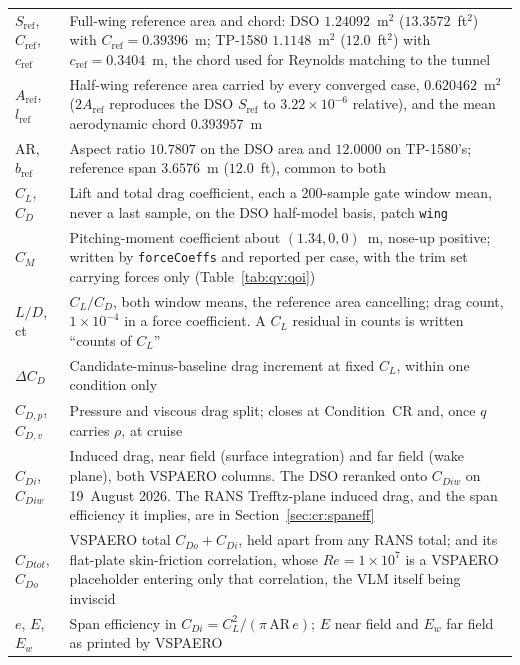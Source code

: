 \documentclass[10pt,a4paper]{article}
\begin{document}
{\begin{longtable}{@{}p{}p{}@{}}
$S_\mathrm{ref}$, $C_\mathrm{ref}$, $c_\mathrm{ref}$ & Full-wing reference area and chord: DSO
  $\num{1.24092}$~m$^2$ ($13.3572$~ft$^2$) with $C_\mathrm{ref}=\num{0.39396}$~m; TP-1580
  $\num{1.1148}$~m$^2$ ($12.0$~ft$^2$) with $c_\mathrm{ref}=\num{0.3404}$~m, the chord used for
  Reynolds matching to the tunnel \\
$A_\mathrm{ref}$, $l_\mathrm{ref}$ & Half-wing reference area carried by every converged case,
  $\num{0.620462}$~m$^2$ ($2A_\mathrm{ref}$ reproduces the DSO $S_\mathrm{ref}$ to
  $3.22\times10^{-6}$ relative), and the mean aerodynamic chord $\num{0.393957}$~m \\
AR, $b_\mathrm{ref}$ & Aspect ratio $\num{10.7807}$ on the DSO area and $\num{12.0000}$ on
  TP-1580's; reference span $\num{3.6576}$~m ($12.0$~ft), common to both \\
\addlinespace
$C_L$, $C_D$ & Lift and total drag coefficient, each a 200-sample gate window mean, never a last
  sample, on the DSO half-model basis, patch \texttt{wing} \\
$C_M$ & Pitching-moment coefficient about $(1.34,0,0)$~m, nose-up positive; written by
  \texttt{forceCoeffs} and reported per case, with the trim set carrying forces only
  (Table~\ref{tab:qv:qoi}) \\
$L/D$, ct & $C_L/C_D$, both window means, the reference area cancelling; drag count,
  $1\times10^{-4}$ in a force coefficient. A $C_L$ residual in counts is written ``counts of
  $C_L$'' \\
$\Delta C_D$ & Candidate-minus-baseline drag increment at fixed $C_L$, within one condition only \\
$C_{D,p}$, $C_{D,v}$ & Pressure and viscous drag split; closes at Condition~CR and, once $q$
  carries $\rho$, at cruise \\
$C_{Di}$, $C_{Diw}$ & Induced drag, near field (surface integration) and far field (wake plane),
  both VSPAERO columns. The DSO reranked onto $C_{Diw}$ on 19~August 2026. The RANS Trefftz-plane
  induced drag, and the span efficiency it implies, are in Section~\ref{sec:cr:spaneff} \\
$C_{Dtot}$, $C_{Do}$ & VSPAERO total $C_{Do}+C_{Di}$, held apart from any RANS total; and its
  flat-plate skin-friction correlation, whose $Re=1\times10^{7}$ is a VSPAERO placeholder
  entering only that correlation, the VLM itself being inviscid \\
$e$, $E$, $E_w$ & Span efficiency in $C_{Di}=C_L^2/(\pi\,\mathrm{AR}\,e)$; $E$ near field and
  $E_w$ far field as printed by VSPAERO \\

\end{longtable}}
\end{document}
